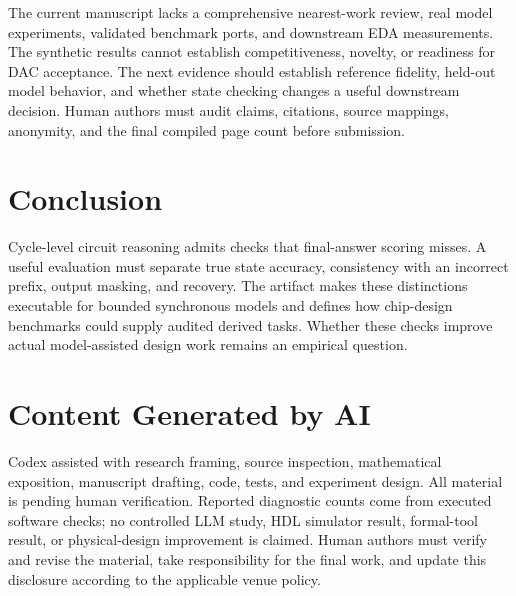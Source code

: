 \documentclass[conference,10pt]{IEEEtran}
\begin{document}
The current manuscript lacks a comprehensive nearest-work review, real model experiments, validated benchmark ports, and downstream EDA measurements. The synthetic results cannot establish competitiveness, novelty, or readiness for DAC acceptance. The next evidence should establish reference fidelity, held-out model behavior, and whether state checking changes a useful downstream decision. Human authors must audit claims, citations, source mappings, anonymity, and the final compiled page count before submission.

\section{Conclusion}
Cycle-level circuit reasoning admits checks that final-answer scoring misses. A useful evaluation must separate true state accuracy, consistency with an incorrect prefix, output masking, and recovery. The artifact makes these distinctions executable for bounded synchronous models and defines how chip-design benchmarks could supply audited derived tasks. Whether these checks improve actual model-assisted design work remains an empirical question.

\section{Content Generated by AI}
Codex assisted with research framing, source inspection, mathematical exposition, manuscript drafting, code, tests, and experiment design. All material is pending human verification. Reported diagnostic counts come from executed software checks; no controlled LLM study, HDL simulator result, formal-tool result, or physical-design improvement is claimed. Human authors must verify and revise the material, take responsibility for the final work, and update this disclosure according to the applicable venue policy.
\end{document}
